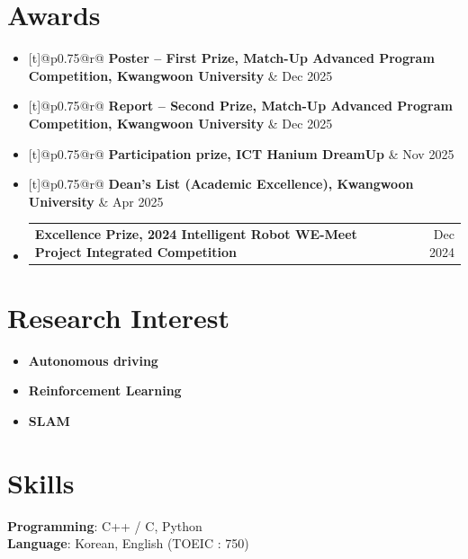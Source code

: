 \documentclass[a4paper,11pt]{article}
\makeatletter
\newcommand{\resumeItem}[1]{
  \item\small{
    {#1 \vspace{-2pt}}
  }
}
\newcommand{\resumeSubheadingSingle}[2]{
  \vspace{-1pt}\item
    \begin{tabular*}{\linewidth}[t]{@{}p{0.75\textwidth}@{\extracolsep{\fill}}r@{}}
      \textbf{#1} & \small #2 \\
    \end{tabular*}\vspace{-5pt}
}
\newcommand{\resumeItemListStart}{\begin{itemize}[leftmargin=0.3in, label={$\bullet$}, labelsep=0.5em, itemsep=4pt]} %
\newcommand{\resumeItemListEnd}{\end{itemize}\vspace{-5pt}}
\makeatother
\begin{document}
\vspace{10pt}
\section{Awards}
  \begin{itemize}[leftmargin=0in, label={}, labelsep=0pt, itemsep=0pt] %
     \resumeSubheadingSingle
      {Poster -- First Prize, Match-Up Advanced Program Competition, Kwangwoon University}{Dec 2025}
     \resumeSubheadingSingle
      {Report -- Second Prize, Match-Up Advanced Program Competition, Kwangwoon University}{Dec 2025}
     \resumeSubheadingSingle
      {Participation prize, ICT Hanium DreamUp}{Nov 2025}
     \resumeSubheadingSingle
      {Dean’s List (Academic Excellence), Kwangwoon University}{Apr 2025}
     \resumeSubheadingSingle
      {Excellence Prize, 2024 Intelligent Robot WE-Meet Project Integrated Competition}{Dec 2024}
  \end{itemize}


\vspace{10pt}
\section{Research Interest}
  \resumeItemListStart
    \resumeItem{\textbf{Autonomous driving}}
    \resumeItem{\textbf{Reinforcement Learning}}
    \resumeItem{\textbf{SLAM}}
  \resumeItemListEnd


\vspace{10pt}
\section{Skills}
 \begin{itemize}[leftmargin=0in, label={}, labelsep=0pt]
    \small{\item{
     \textbf{Programming}{: C++ / C, Python} \\
     \textbf{Language}{: Korean, English (TOEIC : 750)}
    }}
 \end{itemize}
\end{document}

